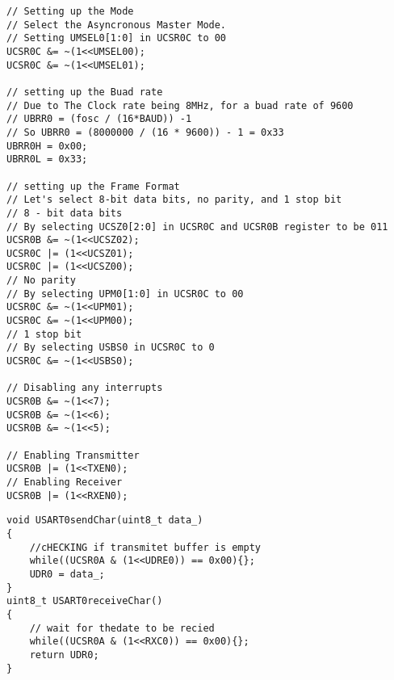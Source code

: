 \documentclass{article}
\begin{document}
\begin{verbatim}
// Setting up the Mode
// Select the Asyncronous Master Mode.
// Setting UMSEL0[1:0] in UCSR0C to 00
UCSR0C &= ~(1<<UMSEL00);
UCSR0C &= ~(1<<UMSEL01);

// setting up the Buad rate
// Due to The Clock rate being 8MHz, for a buad rate of 9600
// UBRR0 = (fosc / (16*BAUD)) -1
// So UBRR0 = (8000000 / (16 * 9600)) - 1 = 0x33
UBRR0H = 0x00;
UBRR0L = 0x33;

// setting up the Frame Format
// Let's select 8-bit data bits, no parity, and 1 stop bit
// 8 - bit data bits
// By selecting UCSZ0[2:0] in UCSR0C and UCSR0B register to be 011
UCSR0B &= ~(1<<UCSZ02);
UCSR0C |= (1<<UCSZ01);
UCSR0C |= (1<<UCSZ00);
// No parity
// By selecting UPM0[1:0] in UCSR0C to 00
UCSR0C &= ~(1<<UPM01);
UCSR0C &= ~(1<<UPM00);
// 1 stop bit
// By selecting USBS0 in UCSR0C to 0 
UCSR0C &= ~(1<<USBS0);

// Disabling any interrupts
UCSR0B &= ~(1<<7);
UCSR0B &= ~(1<<6);
UCSR0B &= ~(1<<5);

// Enabling Transmitter 
UCSR0B |= (1<<TXEN0);
// Enabling Receiver
UCSR0B |= (1<<RXEN0);
\end{verbatim}

\begin{verbatim}
void USART0sendChar(uint8_t data_)
{
	//cHECKING if transmitet buffer is empty
	while((UCSR0A & (1<<UDRE0)) == 0x00){};		
	UDR0 = data_;	
}
uint8_t USART0receiveChar()
{
	// wait for thedate to be recied
	while((UCSR0A & (1<<RXC0)) == 0x00){};		
	return UDR0;
}
\end{verbatim}
\end{document}
